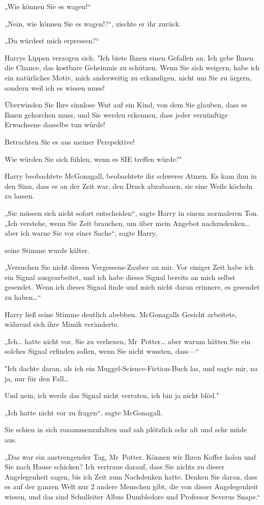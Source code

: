 {„Wie können Sie es wagen!“

„Nein, wie können Sie es wagen!?“, zischte er ihr zurück.

„Du würdest mich erpressen?“

Harrys Lippen verzogen sich. "Ich biete Ihnen einen Gefallen an. Ich gebe Ihnen die Chance, das kostbare Geheimnis zu schützen. Wenn Sie sich weigern, habe ich ein natürliches Motiv, mich anderweitig zu erkundigen, nicht um Sie zu ärgern, sondern weil ich es wissen muss!

Überwinden Sie Ihre sinnlose Wut auf ein Kind, von dem Sie glauben, dass es Ihnen gehorchen muss, und Sie werden erkennen, dass jeder vernünftige Erwachsene dasselbe tun würde!

Betrachten Sie es aus meiner Perspektive!

Wie würden Sie sich fühlen, wenn es SIE treffen würde?"

Harry beobachtete McGonagall, beobachtete ihr schweres Atmen. Es kam ihm in den Sinn, dass es an der Zeit war, den Druck abzubauen, sie eine Weile köcheln zu lassen.

„Sie müssen sich nicht sofort entscheiden“, sagte Harry in einem normaleren Ton. „Ich verstehe, wenn Sie Zeit brauchen, um über mein Angebot nachzudenken…aber ich warne Sie vor einer Sache“, sagte Harry,

seine Stimme wurde kälter.

„Versuchen Sie nicht diesen Vergessens-Zauber an mir. Vor einiger Zeit habe ich ein Signal ausgearbeitet, und ich habe dieses Signal bereits an mich selbst gesendet. Wenn ich dieses Signal finde und mich nicht daran erinnere, es gesendet zu haben…“

Harry ließ seine Stimme deutlich abebben. McGonagalls Gesicht arbeitete, während sich ihre Mimik veränderte.

„Ich… hatte nicht vor, Sie zu verhexen, Mr~Potter… aber warum hätten Sie ein solches Signal erfinden sollen, wenn Sie nicht wussten, dass—“

"Ich dachte daran, als ich ein Muggel-Science-Fiction-Buch las, und sagte mir, na ja, nur für den Fall…

Und nein, ich werde das Signal nicht verraten, ich bin ja nicht blöd."

„Ich hatte nicht vor zu fragen“, sagte McGonagall.

Sie schien in sich zusammenzufalten und sah plötzlich sehr alt und sehr müde aus.

„Das war ein anstrengender Tag, Mr~Potter. Können wir Ihren Koffer holen und Sie nach Hause schicken? Ich vertraue darauf, dass Sie nichts zu dieser Angelegenheit sagen, bis ich Zeit zum Nachdenken hatte. Denken Sie daran, dass es auf der ganzen Welt nur 2 andere Menschen gibt, die von dieser Angelegenheit wissen, und das sind Schulleiter Albus Dumbledore und Professor Severus Snape.“

}
